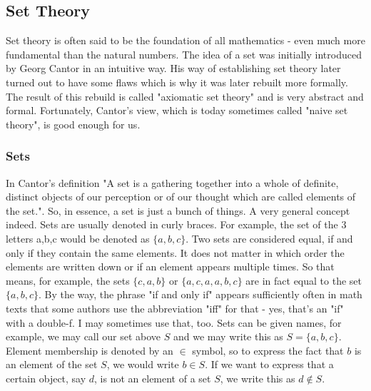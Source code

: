 

\subsection{Set Theory}
Set theory is often said to be the foundation of all mathematics - even much more fundamental than the natural numbers. 
The idea of a set was initially introduced by Georg Cantor in an intuitive way. His way of establishing set theory later turned out to have some flaws which is why it was later rebuilt more formally. The result of this rebuild is called "axiomatic set theory" and is very abstract and formal. Fortunately, Cantor's view, which is today sometimes called "naive set theory", is good enough for us. 

\subsubsection{Sets}
In Cantor's definition "A set is a gathering together into a whole of definite, distinct objects of our perception or of our thought which are called elements of the set.". So, in essence, a set is just a bunch of things. A very general concept indeed. Sets are usually denoted in curly braces. For example, the set of the 3 letters a,b,c would be denoted as $\{a,b,c\}$. Two sets are considered equal, if and only if they contain the same elements. It does not matter in which order the elements are written down or if an element appears multiple times. So that means, for example, the sets $\{c,a,b\}$ or $\{a,c,a,a,b,c\}$ are in fact equal to the set $\{a,b,c\}$. By the way, the phrase "if and only if" appears sufficiently often in math texts that some authors use the abbreviation "iff" for that - yes, that's an "if" with a double-f. I may sometimes use that, too. Sets can be given names, for example, we may call our set above $S$ and we may write this as $S = \{a,b,c\}$. Element membership is denoted by an $\in$ symbol, so to express the fact that $b$ is an element of the set $S$, we would write $b \in S$. If we want to express that a certain object, say $d$, is not an element of a set $S$, we write this as $d \notin S$.

